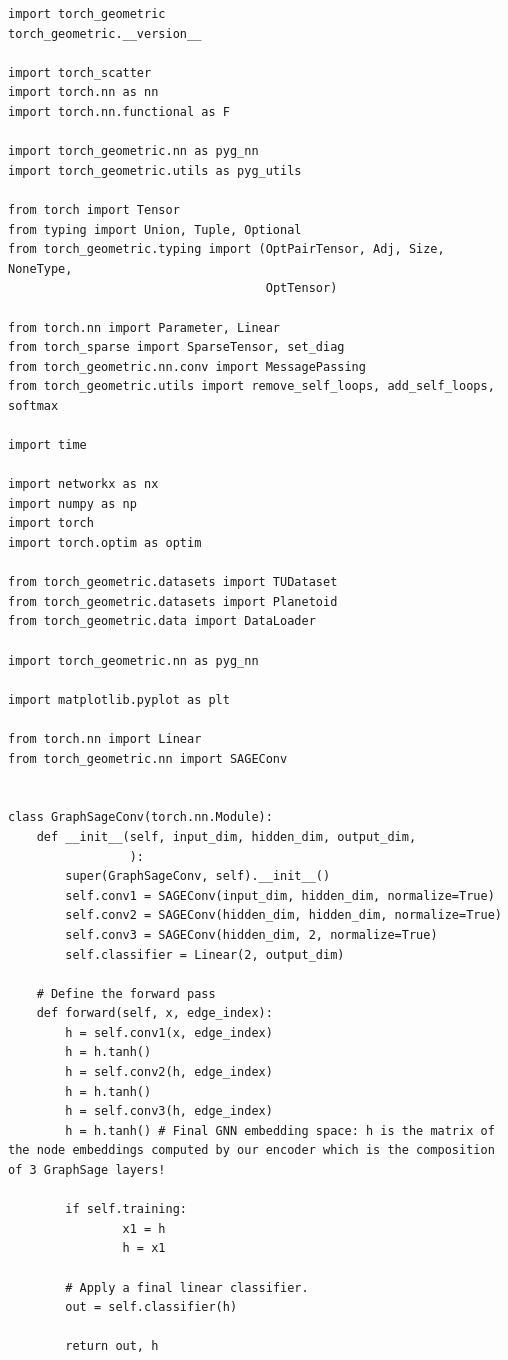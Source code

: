 \documentclass[12pt,a4paper]{report}
\theoremstyle{definition}
\begin{document}
\begin{lstlisting}
import torch_geometric
torch_geometric.__version__

import torch_scatter
import torch.nn as nn
import torch.nn.functional as F

import torch_geometric.nn as pyg_nn
import torch_geometric.utils as pyg_utils

from torch import Tensor
from typing import Union, Tuple, Optional
from torch_geometric.typing import (OptPairTensor, Adj, Size, NoneType,
                                    OptTensor)

from torch.nn import Parameter, Linear
from torch_sparse import SparseTensor, set_diag
from torch_geometric.nn.conv import MessagePassing
from torch_geometric.utils import remove_self_loops, add_self_loops, softmax

import time

import networkx as nx
import numpy as np
import torch
import torch.optim as optim

from torch_geometric.datasets import TUDataset
from torch_geometric.datasets import Planetoid
from torch_geometric.data import DataLoader

import torch_geometric.nn as pyg_nn

import matplotlib.pyplot as plt

from torch.nn import Linear
from torch_geometric.nn import SAGEConv


class GraphSageConv(torch.nn.Module):
    def __init__(self, input_dim, hidden_dim, output_dim,
                 ):
        super(GraphSageConv, self).__init__()
        self.conv1 = SAGEConv(input_dim, hidden_dim, normalize=True)
        self.conv2 = SAGEConv(hidden_dim, hidden_dim, normalize=True)
        self.conv3 = SAGEConv(hidden_dim, 2, normalize=True)
        self.classifier = Linear(2, output_dim)

    # Define the forward pass
    def forward(self, x, edge_index):
        h = self.conv1(x, edge_index)
        h = h.tanh()
        h = self.conv2(h, edge_index)
        h = h.tanh()
        h = self.conv3(h, edge_index)
        h = h.tanh() # Final GNN embedding space: h is the matrix of the node embeddings computed by our encoder which is the composition of 3 GraphSage layers!

        if self.training:
                x1 = h 
                h = x1
        
        # Apply a final linear classifier.
        out = self.classifier(h)

        return out, h

\end{lstlisting}
\end{document}
